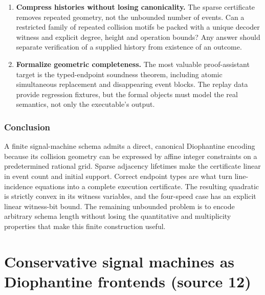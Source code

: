 \documentclass[11pt,letterpaper]{article}
\numberwithin{equation}{section}
\theoremstyle{definition}
\theoremstyle{remark}
\begin{document}
\begin{enumerate}
\item\label{smc:sd:q:compress} \textbf{Compress histories without losing canonicality.} The sparse certificate removes repeated geometry, not the unbounded number of events. Can a restricted family of repeated collision motifs be packed with a unique decoder witness and explicit degree, height and operation bounds? Any answer should separate verification of a supplied history from existence of an outcome.
\item\label{smc:sd:q:formal} \textbf{Formalize geometric completeness.} The most valuable proof-assistant target is the typed-endpoint soundness theorem, including atomic simultaneous replacement and disappearing event blocks. The replay data provide regression fixtures, but the formal objects must model the real semantics, not only the executable's output.
\end{enumerate}

\section{Conclusion}\label{smc:sd:sec:conclusion}
A finite signal-machine schema admits a direct, canonical Diophantine encoding because its collision geometry can be expressed by affine integer constraints on a predetermined rational grid. Sparse adjacency lifetimes make the certificate linear in event count and initial support. Correct endpoint types are what turn line-incidence equations into a complete execution certificate. The resulting quadratic is strictly convex in its witness variables, and the four-speed case has an explicit linear witness-bit bound. The remaining unbounded problem is to encode arbitrary schema length without losing the quantitative and multiplicity properties that make this finite construction useful.

\part{Conservative signal machines as Diophantine frontends (source 12)}\label{smc:cs:part}
\end{document}
